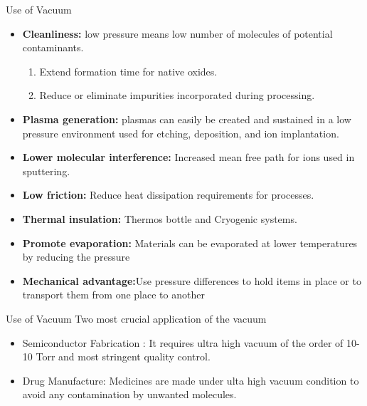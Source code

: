 \documentclass[11]{beamer}
\begin{document}
\begin{frame}{Use of Vacuum}

      \begin{itemize}
       \item \textbf{Cleanliness:}  low pressure means low number of molecules of potential contaminants.

			\begin{enumerate}
				\item	Extend formation time for native oxides.
				\item	Reduce or eliminate impurities incorporated during processing.
			\end{enumerate}
			
		\item 	\textbf{Plasma generation:}  plasmas can easily be created and sustained in a low pressure environment
used for etching, deposition, and ion implantation.
		\item		\textbf{Lower molecular interference:} Increased mean free path for ions used in sputtering.
		
		
		\item		\textbf{Low friction:} Reduce heat dissipation requirements for processes.
		\item		\textbf{Thermal insulation:} Thermos bottle and Cryogenic systems.

		\item		\textbf{Promote evaporation:} Materials can be evaporated at lower temperatures by reducing the pressure
		\item		\textbf{Mechanical advantage:}Use pressure differences to hold items in place or to transport them from one place to another
      \end{itemize}
      
      

\end{frame}

\begin{frame}{Use of Vacuum}
Two most crucial application of the vacuum
		\begin{itemize}
          \item Semiconductor Fabrication : It requires ultra high vacuum of the order of 10-10 Torr and most stringent quality control.
          \item Drug Manufacture: Medicines are made  under ulta high vacuum condition to avoid any contamination by unwanted molecules.
		
		\end{itemize}

\end{frame}
\end{document}
